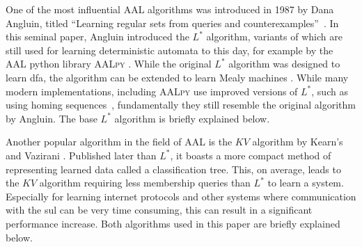 One of the most influential AAL algorithms was introduced in 1987 by Dana Angluin, titled ``Learning regular sets from queries and counterexamples''~\parencite{ANGLUIN198787}. In this seminal paper, Angluin introduced the $L^*$ algorithm, variants of which are still used for learning deterministic automata to this day, for example by the AAL python library \textsc{AALpy} \parencite{muvskardin2022aalpy}. While the original $L^*$ algorithm was designed to learn \ac{dfa}, the algorithm can be extended to learn Mealy machines \parencite{Niese2003AnIA}. While many modern implementations, including \textsc{AALpy} use improved versions of $L^*$, such as using homing sequences~\parencite{Rivest1993Inference}, fundamentally they still resemble the original algorithm by Angluin. The base $L^*$ algorithm is briefly explained below.

Another popular algorithm in the field of AAL is the $KV$ algorithm by Kearn's and Vazirani \parencite{KV1994}. Published later than $L^*$, it boasts a more compact method of representing learned data called a classification tree. This, on average, leads to the $KV$ algorithm requiring less membership queries than $L^*$ to learn a system. Especially for learning internet protocols and other systems where communication with the \ac{sul} can be very time consuming, this can result in a significant performance increase. Both algorithms used in this paper are briefly explained below.

